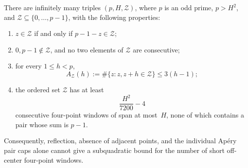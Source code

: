 \begin{proposition}
\label{prop:pair-cap-extremal}
There are infinitely many triples $(p,H,\mathcal Z)$, where $p$ is an
odd prime, $p>H^2$, and
$\mathcal Z\subseteq\{0,\ldots,p-1\}$, with the following properties:
\begin{enumerate}
 \item $z\in\mathcal Z$ if and only if $p-1-z\in\mathcal Z$;
 \item $0,p-1\notin\mathcal Z$, and no two elements of $\mathcal Z$ are
 consecutive;
 \item for every $1\le h<p$,
 \[
  A_{\mathcal Z}(h)
  :=\#\{z:z,z+h\in\mathcal Z\}\le3(h-1);
 \]
 \item the ordered set $\mathcal Z$ has at least
 \[
  \frac{H^2}{7200}-4
 \]
 consecutive four-point windows of span at most~$H$, none of which
 contains a pair whose sum is $p-1$.
\end{enumerate}
Consequently, reflection, absence of adjacent points, and the individual
Ap\'ery pair caps alone cannot give a subquadratic bound for the number of
short off-center four-point windows.
\end{proposition}

